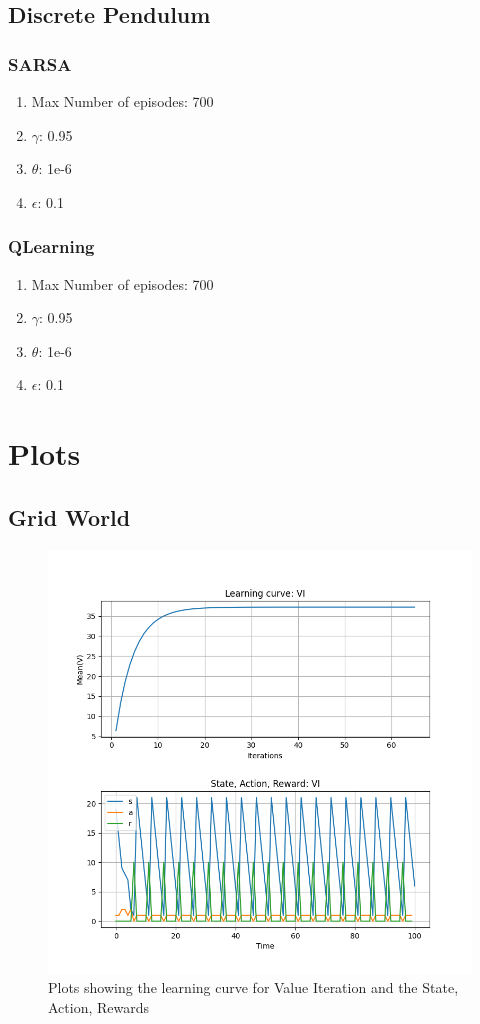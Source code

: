 \documentclass[conf]{new-aiaa}
\begin{document}
\subsection{Discrete Pendulum}

\subsubsection{SARSA}
\begin{enumerate}
    \item Max Number of episodes: 700
    \item $\gamma$: 0.95
    \item $\theta$: 1e-6
    \item $\epsilon$: 0.1
\end{enumerate}

\subsubsection{QLearning}
\begin{enumerate}
    \item Max Number of episodes: 700
    \item $\gamma$: 0.95
    \item $\theta$: 1e-6
    \item $\epsilon$: 0.1
\end{enumerate}


\section{Plots}
\subsection{Grid World}
\begin{figure}[H]
\centering
\includegraphics[width=30pc]{figs/gw/learning_and_trajectory_vi.png}
\caption{Plots showing the learning curve for Value Iteration and the State, Action, Rewards}
\label{fig_env1}
\end{figure}
\end{document}

